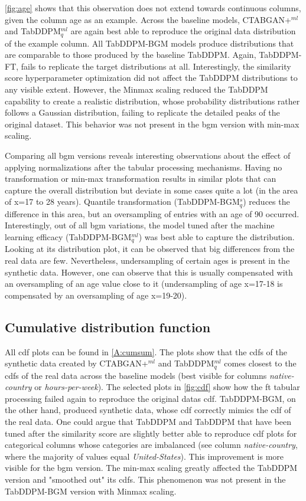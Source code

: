 \autoref{fig:age} shows that this observation does not extend towards continuous columns, given the column age as an example.
Across the baseline models, CTABGAN+$^{ml}$ and TabDDPM$^{ml}_q$ are again best able to reproduce the original data distribution of the example column.
All TabDDPM-BGM models produce distributions that are comparable to those produced by the baseline TabDDPM.
Again, TabDDPM-FT, fails to replicate the target distributions at all.
Interestingly, the similarity score hyperparameter optimization did not affect the TabDDPM distributions to any visible extent.
However, the Minmax scaling reduced the TabDDPM capability to create a realistic distribution, whose probability distributions rather follows a Gaussian distribution, failing to replicate the detailed peaks of the original dataset.
This behavior was not present in the \gls{bgm} version with min-max scaling.

Comparing all \gls{bgm} versions reveals interesting observations about the effect of applying normalizations after the tabular processing mechanisms.
Having no transformation or min-max transformation results in similar plots that can capture the overall distribution but deviate in some cases quite a lot (in the area of x=17 to 28 years).
Quantile transformation (TabDDPM-BGM$^{s}_q$) reduces the difference in this area, but an oversampling of entries with an age of 90 occurred.
Interestingly, out of all \gls{bgm} variations, the model tuned after the machine learning efficacy (TabDDPM-BGM$^{ml}_q$) was best able to capture the distribution.
Looking at its  distribution plot, it can be observed that big differences from the real data are few.
Nevertheless, undersampling of certain ages is present in the synthetic data.
However, one can observe that this is usually compensated with an oversampling of an age value close to it
(\eg undersampling of age x=17-18 is compensated by an oversampling of age x=19-20).

\subsection{Cumulative distribution function}
All \gls{cdf} plots can be found in \autoref{A:cumsum}.
The plots show that the \glspl{cdf} of the synthetic data created by CTABGAN+$^{ml}$ and TabDDPM$^{ml}_q$ comes closest to
the \glspl{cdf} of the real data across the baseline models (best visible for columns \textit{native-country} or \textit{hours-per-week}).
The selected plots in \autoref{fig:cdf} show how the \gls{ft} tabular processing failed again to reproduce the original datas \gls{cdf}.
TabDDPM-BGM, on the other hand, produced synthetic data, whose \gls{cdf} correctly mimics the \gls{cdf} of the real data.
One could argue that TabDDPM and TabDDPM that have been tuned after the similarity score are slightly better able to
reproduce \gls{cdf} plots for categorical columns whose categories are imbalanced (\eg see column \textit{native-country}, where the majority of values equal \textit{United-States}).
This improvement is more visible for the \gls{bgm} version.
The min-max scaling greatly affected the TabDDPM version and "smoothed out" its \glspl{cdf}.
This phenomenon was not present in the TabDDPM-BGM version with Minmax scaling.

